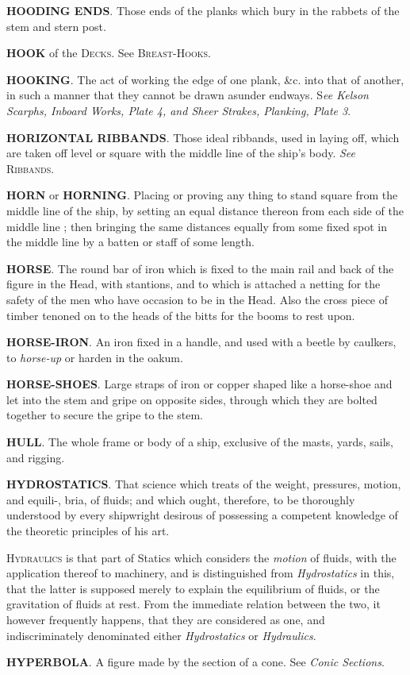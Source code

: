 \textbf{HOODING ENDS}. Those ends of the planks which bury in the rabbets of the stem and stern post. 

\textbf{HOOK} of the \textsc{Decks}. See \textsc{Breast-Hooks}. 

\textbf{HOOKING}. The act of working the edge of one plank, \&c. into that of another, in such a manner that they cannot be drawn asunder endways. S\textit{ee Kelson Scarphs, Inboard Works, Plate 4, and Sheer Strakes, Planking, Plate 3}. 

\textbf{HORIZONTAL RIBBANDS}. Those ideal ribbands, used in laying off, which are taken off level or square with the middle line of the ship's body. \textit{See} \textsc{Ribbands}. 

\textbf{HORN} or \textbf{HORNING}. Placing or proving any thing to stand square from the middle line of the ship, by setting an equal distance thereon from each side of the middle line ; then bringing the same distances equally from some fixed spot in the middle line by a batten or staff of some length. 

\textbf{HORSE}. The round bar of iron which is fixed to the main rail and back of the figure in the Head, with stantions, and to which is attached a netting for the safety of the men who have occasion to be in the Head. Also the cross piece of timber tenoned on to the heads of the bitts for the booms to rest upon. 

\textbf{HORSE-IRON}. An iron fixed in a handle, and used with a beetle by caulkers, to \textit{horse-up} or harden in the oakum. 

\textbf{HORSE-SHOES}. Large straps of iron or copper shaped like a horse-shoe and let into the stem and gripe on opposite sides, through which they are bolted together to secure the gripe to the stem. 

\textbf{HULL}. The whole frame or body of a ship, exclusive of the masts, yards, sails, and rigging. 

\textbf{HYDROSTATICS}. That science which treats of the weight, pressures, motion, and equili-, bria, of fluids; and which ought, therefore, to be thoroughly understood by every shipwright desirous of possessing a competent knowledge of the theoretic principles of his art. 

\textsc{Hydraulics} is that part of Statics which considers the \textit{motion} of fluids, with the application thereof to machinery, and is distinguished from \textit{Hydrostatics} in this, that the latter is supposed merely to explain the equilibrium of fluids, or the gravitation of fluids at rest. From the immediate relation between the two, it however frequently happens, that they are considered as one, and indiscriminately denominated either \textit{Hydrostatics} or \textit{Hydraulics}. 

\textbf{HYPERBOLA}. A figure made by the section of a cone. See \textit{Conic Sections}.
